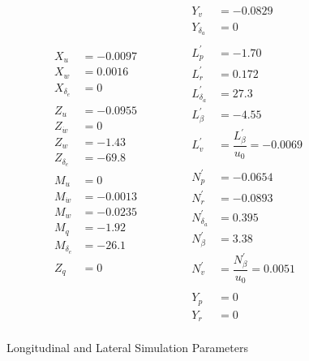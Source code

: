 \documentclass[12pt]{article}
\begin{document}
\begin{figure}
\begin{equation*}
  \begin{split}
  X_u &= -0.0097 \\
  X_w &= 0.0016 \\
  X_{\delta_e} &= 0 \\
  \\
  Z_u &= -0.0955 \\
  Z_{\dot{w}} &= 0 \\
  Z_w &= -1.43 \\
  Z_{\delta_e} &= -69.8 \\
  \\
  M_u &= 0 \\
  M_{\dot{w}} &= -0.0013 \\
  M_w &= -0.0235 \\
  M_q &= -1.92 \\
  M_{\delta_e} &= -26.1 \\
  \\
  Z_q &= 0 \\
  \end{split}
\quad\quad
\quad\quad
  \begin{split}
  Y_v &= -0.0829 \\
  Y_{\delta_a} &= 0 \\
  \\
  L_p^\prime &= -1.70 \\
  L_r^\prime &= 0.172 \\
  L_{\delta_a}^\prime &= 27.3 \\
  L_{\beta}^\prime &= -4.55 \\
  L_v^\prime &= \dfrac{L_{\beta}^\prime}{u_0} =-0.0069 \\
  \\
  N_p^\prime &= -0.0654 \\
  N_r^\prime &= -0.0893 \\
  N_{\delta_a}^\prime &= 0.395 \\
  N_{\beta}^\prime &= 3.38 \\
  N_v^\prime &= \dfrac{N_{\beta}^\prime}{u_0} = 0.0051 \\
  \\
  Y_p &= 0 \\
  Y_r &= 0 \\
  \end{split}
\end{equation*}
  \caption{Longitudinal and Lateral Simulation Parameters}
\end{figure}
\end{document}
